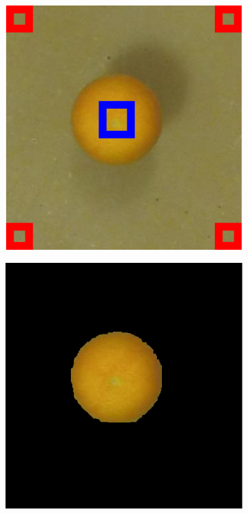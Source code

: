 \documentclass {udthesis}
\begin{document}
\begin{figure}
\begin{subfigure}[]{0.2\textwidth}
      \caption{}
      \label{fig:good_seg_visualattn_seg}
  \end{subfigure}
  \begin{subfigure}[]{0.2\textwidth}
      \includegraphics[width=\textwidth]{distdes_annotation_good_recursive_seeds}
      \caption{}
      \label{fig:good_seg_recursive_seeds}
  \end{subfigure}
  \begin{subfigure}[]{0.2\textwidth}
      \includegraphics[width=\textwidth]{distdes_annotation_good_recursive_segment}

\end{subfigure}
\end{figure}
\end{document}
